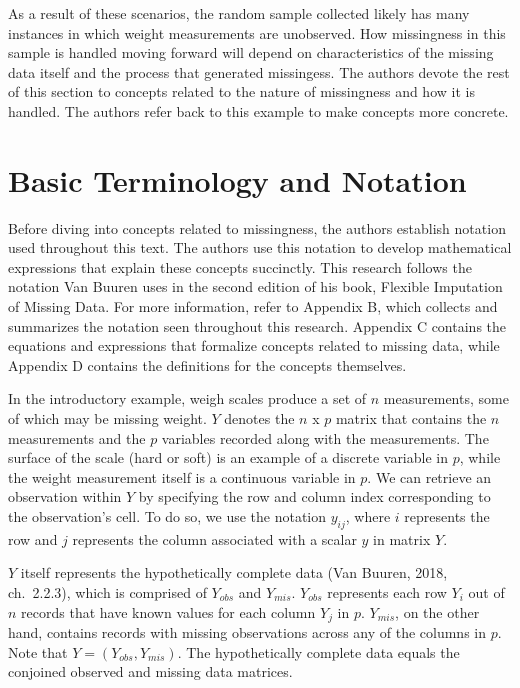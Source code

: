 \documentclass[12pt,oneside]{chicagocapstone}
\begin{document}
As a result of these scenarios, the random sample collected likely has
many instances in which weight measurements are unobserved. How
missingness in this sample is handled moving forward will depend on
characteristics of the missing data itself and the process that
generated missingess. The authors devote the rest of this section to
concepts related to the nature of missingness and how it is handled. The
authors refer back to this example to make concepts more concrete.

\section*{Basic Terminology and Notation}\label{background-basic-terms}

Before diving into concepts related to missingness, the authors
establish notation used throughout this text. The authors use this
notation to develop mathematical expressions that explain these concepts
succinctly. This research follows the notation Van Buuren uses in the
second edition of his book, Flexible Imputation of Missing Data. For
more information, refer to Appendix B, which collects and summarizes the
notation seen throughout this research. Appendix C contains the
equations and expressions that formalize concepts related to missing
data, while Appendix D contains the definitions for the concepts
themselves.

In the introductory example, weigh scales produce a set of \(n\)
measurements, some of which may be missing weight. \(Y\) denotes the
\(n\) x \(p\) matrix that contains the \(n\) measurements and the \(p\)
variables recorded along with the measurements. The surface of the scale
(hard or soft) is an example of a discrete variable in \(p\), while the
weight measurement itself is a continuous variable in \(p\). We can
retrieve an observation within \(Y\) by specifying the row and column
index corresponding to the observation's cell. To do so, we use the
notation \(y_{ij}\), where \(i\) represents the row and \(j\) represents
the column associated with a scalar \(y\) in matrix \(Y\).

\(Y\) itself represents the hypothetically complete data (Van Buuren,
2018, ch.~2.2.3), which is comprised of \(Y_{obs}\) and \(Y_{mis}\).
\(Y_{obs}\) represents each row \(Y_i\) out of \(n\) records that have
known values for each column \(Y_j\) in \(p\). \(Y_{mis}\), on the other
hand, contains records with missing observations across any of the
columns in \(p\). Note that \(Y = (Y_{obs}, Y_{mis})\). The
hypothetically complete data equals the conjoined observed and missing
data matrices.
\end{document}
